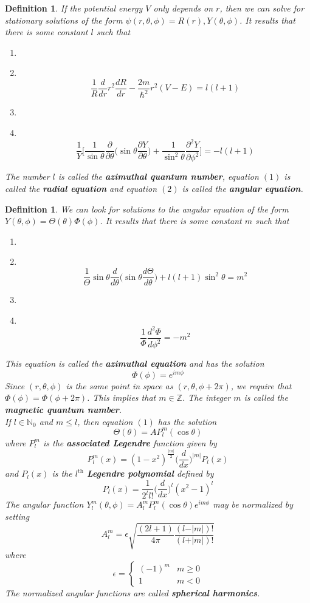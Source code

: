 \documentclass[12pt]{amsart}
\newtheorem{defn}[thm]{Definition}
\newcommand\Item[1][]{%
  \ifx\relax#1\relax  \item \else \item[#1] \fi
  \abovedisplayskip=0pt\abovedisplayshortskip=0pt~\vspace*{-\baselineskip}}
\newcommand{\ep}{\epsilon}
\newcommand{\N}{\mathbb{N}}
\newcommand{\Z}{\mathbb{Z}}
\newcommand{\p}[1]{\frac{\partial}{\partial{#1}}}
\begin{document}
\begin{defn}
If the potential energy $V$ only depends on $r$, then we can solve for stationary solutions of the form $\psi(r, \theta, \phi) = R(r), Y(\theta, \phi)$. It results that there is some constant $l$ such that 

\begin{enumerate}
\Item 
$$\frac{1}{R} \frac{d}{dr} r^2 \frac{dR}{dr} - \frac{2m}{\hbar^2}r^2(V -E) = l(l+1)$$ \vspace{3mm}
\Item 
$$\frac{1}{Y}\bigg[\frac{1}{\sin \theta}\p{\theta} \bigg(\sin \theta \frac{\partial Y}{\partial \theta} \bigg) + \frac{1}{\sin^2 \theta}\frac{\partial^2Y}{\partial \phi^2} \bigg] = -l(l+1)$$

\end{enumerate} \vspace{3mm}
The number $l$ is called the \textbf{azimuthal quantum number}, equation $(1)$ is called the \textbf{radial equation} and equation $(2)$ is called the \textbf{angular equation}. 
\end{defn}

\begin{defn}
We can look for solutions to the angular equation of the form \\$Y(\theta, \phi) = \Theta(\theta)\Phi(\phi)$. It results that there is some constant $m$ such that 
\begin{enumerate}
\Item 
$$\frac{1}{\Theta}  \sin \theta \frac{d}{d\theta}\bigg( \sin \theta \frac{d\Theta}{d\theta} \bigg) + l (l+1) \sin^2 \theta = m^2$$
\vspace{3mm}
\Item $$\frac{1}{\Phi} \frac{d^2 \Phi}{d\phi^2} = -m^2$$
\end{enumerate} \vspace{3mm}
This equation is called the \textbf{azimuthal equation} and has the solution $$\Phi(\phi) = e^{im\phi}$$
Since $(r,\theta, \phi)$ is the same point in space as $(r, \theta, \phi+2 \pi)$, we require that $\Phi(\phi) = \Phi(\phi+2\pi)$. This implies that $m \in \Z$. The integer $m$ is called the \textbf{magnetic quantum number}. \vspace{3mm}\\ 
If $l \in \N_0$ and $m \leq l$, then equation $(1)$ has the solution $$\Theta(\theta) = AP_l^m(\cos \theta)$$ where $P_l^m$ is the \textbf{associated Legendre} function given by $$P_l^m(x) = (1-x^2)^{\frac{\vert m \vert}{2}}\bigg(\frac{d}{dx} \bigg)^{\vert m \vert} P_l(x)$$ and $P_l(x)$ is the $l^{\text{th}}$ \textbf{Legendre polynomial} defined by $$P_l(x) = \frac{1}{2^l l!} \bigg(\frac{d}{dx} \bigg)^{l}(x^2 -1)^l$$ \vspace{3mm} The angular function $Y^m_l(\theta, \phi) = A_l^m P_l^m(\cos \theta)e^{im\phi}$ may be normalized by setting $$A_l^m = \ep \sqrt{\frac{(2l+1)}{4\pi} \frac{(l-\vert m \vert)!}{(l+ \vert m \vert)!}}$$ where $$\ep = 
\begin{cases}
(-1)^m & m \geq 0\\
1 & m < 0
\end{cases}$$ The normalized angular functions are called \textbf{spherical harmonics}.
\end{defn}
\end{document}
